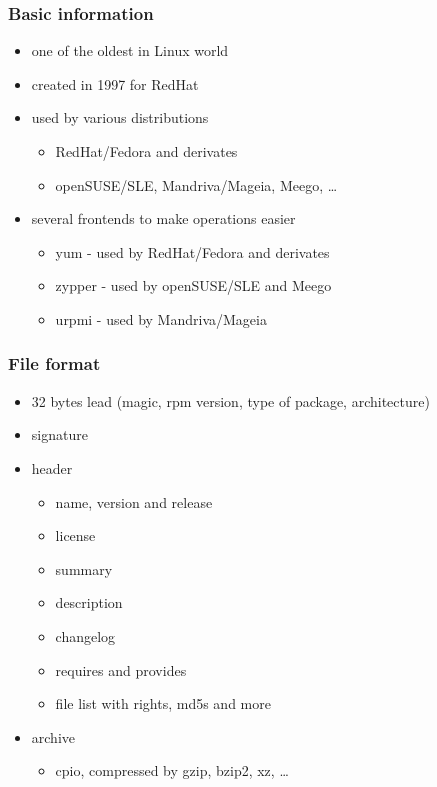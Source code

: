 
\begin{frame}[t]
   \frametitle{Basic information}
   \begin{itemize}
	\item one of the oldest in Linux world
	\item created in 1997 for RedHat
	\item used by various distributions
	\begin{itemize}
		\item RedHat/Fedora and derivates
		\item openSUSE/SLE, Mandriva/Mageia, Meego, \dots
	\end{itemize}
	\item several frontends to make operations easier
	\begin{itemize}
		\item yum - used by RedHat/Fedora and derivates
		\item zypper - used by openSUSE/SLE and Meego
		\item urpmi - used by Mandriva/Mageia
	\end{itemize}
   \end{itemize}
\end{frame}


\begin{frame}[t]
   \frametitle{File format}
   \begin{itemize}
      \item 32 bytes lead (magic, rpm version, type of package, architecture)
      \item signature
      \item header
      \begin{itemize}
         \item name, version and release
         \item license
         \item summary
         \item description
         \item changelog
         \item requires and provides
         \item file list with rights, md5s and more
      \end{itemize}
      \item archive
      \begin{itemize}
	\item cpio, compressed by gzip, bzip2, xz, \dots
      \end{itemize}
   \end{itemize}
\end{frame}


